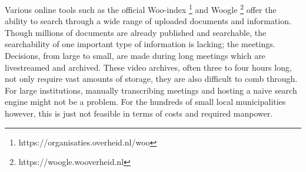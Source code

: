 \documentclass[twoside]{uva-inf-bachelor-thesis}
\begin{document}
Various online tools such as the official Woo-index \footnote{https://organisaties.overheid.nl/woo} and Woogle \footnote{https://woogle.wooverheid.nl} offer the ability to search through a wide range of uploaded documents and information. 
Though millions of documents are already published and searchable, the searchability of one important type of information is lacking; the meetings. Decisions, from large to small, are made during long meetings which are livestreamed and archived. These video archives, often three to four hours long, not only require vast amounts of storage, they are also difficult to comb through. For large institutions, manually transcribing meetings and hosting a naive search engine might not be a problem. For the hundreds of small local municipalities however, this is just not feasible in terms of costs and required manpower.
\end{document}
